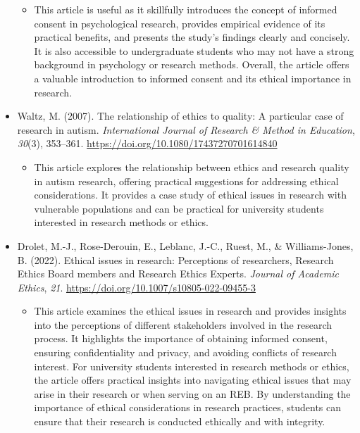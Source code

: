 \documentclass[
  11pt,
]{book}
\providecommand{\tightlist}{%
  \setlength{\itemsep}{0pt}\setlength{\parskip}{0pt}}
\begin{document}
\begin{itemize}
  \begin{itemize}
  \tightlist
  \item
    This article is useful as it skillfully introduces the concept of informed consent in psychological research, provides empirical evidence of its practical benefits, and presents the study's findings clearly and concisely. It is also accessible to undergraduate students who may not have a strong background in psychology or research methods. Overall, the article offers a valuable introduction to informed consent and its ethical importance in research.
  \end{itemize}
\item
  Waltz, M. (2007). The relationship of ethics to quality: A particular case of research in autism. \emph{International Journal of Research \& Method in Education}, \emph{30}(3), 353--361. \url{https://doi.org/10.1080/17437270701614840}

  \begin{itemize}
  \tightlist
  \item
    This article explores the relationship between ethics and research quality in autism research, offering practical suggestions for addressing ethical considerations. It provides a case study of ethical issues in research with vulnerable populations and can be practical for university students interested in research methods or ethics.
  \end{itemize}
\item
  Drolet, M.-J., Rose-Derouin, E., Leblanc, J.-C., Ruest, M., \& Williams-Jones, B. (2022). Ethical issues in research: Perceptions of researchers, Research Ethics Board members and Research Ethics Experts. \emph{Journal of Academic Ethics}, \emph{21}. \url{https://doi.org/10.1007/s10805-022-09455-3}

  \begin{itemize}
  \tightlist
  \item
    This article examines the ethical issues in research and provides insights into the perceptions of different stakeholders involved in the research process. It highlights the importance of obtaining informed consent, ensuring confidentiality and privacy, and avoiding conflicts of research interest. For university students interested in research methods or ethics, the article offers practical insights into navigating ethical issues that may arise in their research or when serving on an REB. By understanding the importance of ethical considerations in research practices, students can ensure that their research is conducted ethically and with integrity.
  \end{itemize}
\end{itemize}
\end{document}
